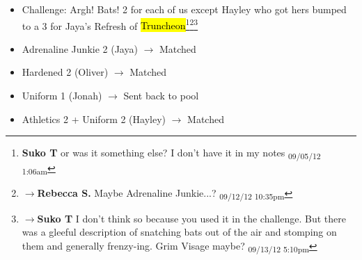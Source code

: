 
{
\parskip=0pt
\begin{itemize}
\item Challenge: Argh!  Bats! 2 for each of us except Hayley who got hers bumped to a 3 for Jaya's Refresh of \hl{Truncheon}\footnote{\textbf{Suko T }or was it something else?  I don't have it in my notes \textsubscript{09/05/12 1:06am}}\footnote{$\rightarrow$\textbf{Rebecca S. }Maybe Adrenaline Junkie...? \textsubscript{09/12/12 10:35pm}}\footnote{$\rightarrow$\textbf{Suko T }I don't think so because you used it in the challenge.  But there was a gleeful description of snatching bats out of the air and stomping on them and generally frenzy-ing.  Grim Visage maybe? \textsubscript{09/13/12 5:10pm}}
\end{itemize}

\begin{itemize}
\item Adrenaline Junkie 2 (Jaya) $\rightarrow$ Matched
\item Hardened 2 (Oliver) $\rightarrow$ Matched
\item Uniform 1 (Jonah) $\rightarrow$ Sent back to pool
\item Athletics 2 + Uniform 2 (Hayley) $\rightarrow$ Matched
\end{itemize}

}
